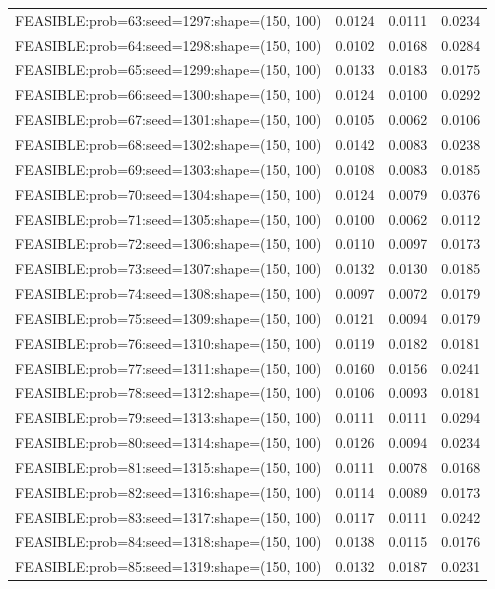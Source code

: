 \begin{longtable}{lccc}
FEASIBLE:prob=63:seed=1297:shape=(150, 100)  &   0.0124 & 0.0111 & 0.0234 \\
FEASIBLE:prob=64:seed=1298:shape=(150, 100)  &   0.0102 & 0.0168 & 0.0284 \\
FEASIBLE:prob=65:seed=1299:shape=(150, 100)  &   0.0133 & 0.0183 & 0.0175 \\
FEASIBLE:prob=66:seed=1300:shape=(150, 100)  &   0.0124 & 0.0100 & 0.0292 \\
FEASIBLE:prob=67:seed=1301:shape=(150, 100)  &   0.0105 & 0.0062 & 0.0106 \\
FEASIBLE:prob=68:seed=1302:shape=(150, 100)  &   0.0142 & 0.0083 & 0.0238 \\
FEASIBLE:prob=69:seed=1303:shape=(150, 100)  &   0.0108 & 0.0083 & 0.0185 \\
FEASIBLE:prob=70:seed=1304:shape=(150, 100)  &   0.0124 & 0.0079 & 0.0376 \\
FEASIBLE:prob=71:seed=1305:shape=(150, 100)  &   0.0100 & 0.0062 & 0.0112 \\
FEASIBLE:prob=72:seed=1306:shape=(150, 100)  &   0.0110 & 0.0097 & 0.0173 \\
FEASIBLE:prob=73:seed=1307:shape=(150, 100)  &   0.0132 & 0.0130 & 0.0185 \\
FEASIBLE:prob=74:seed=1308:shape=(150, 100)  &   0.0097 & 0.0072 & 0.0179 \\
FEASIBLE:prob=75:seed=1309:shape=(150, 100)  &   0.0121 & 0.0094 & 0.0179 \\
FEASIBLE:prob=76:seed=1310:shape=(150, 100)  &   0.0119 & 0.0182 & 0.0181 \\
FEASIBLE:prob=77:seed=1311:shape=(150, 100)  &   0.0160 & 0.0156 & 0.0241 \\
FEASIBLE:prob=78:seed=1312:shape=(150, 100)  &   0.0106 & 0.0093 & 0.0181 \\
FEASIBLE:prob=79:seed=1313:shape=(150, 100)  &   0.0111 & 0.0111 & 0.0294 \\
FEASIBLE:prob=80:seed=1314:shape=(150, 100)  &   0.0126 & 0.0094 & 0.0234 \\
FEASIBLE:prob=81:seed=1315:shape=(150, 100)  &   0.0111 & 0.0078 & 0.0168 \\
FEASIBLE:prob=82:seed=1316:shape=(150, 100)  &   0.0114 & 0.0089 & 0.0173 \\
FEASIBLE:prob=83:seed=1317:shape=(150, 100)  &   0.0117 & 0.0111 & 0.0242 \\
FEASIBLE:prob=84:seed=1318:shape=(150, 100)  &   0.0138 & 0.0115 & 0.0176 \\
FEASIBLE:prob=85:seed=1319:shape=(150, 100)  &   0.0132 & 0.0187 & 0.0231 \\

\end{longtable}
